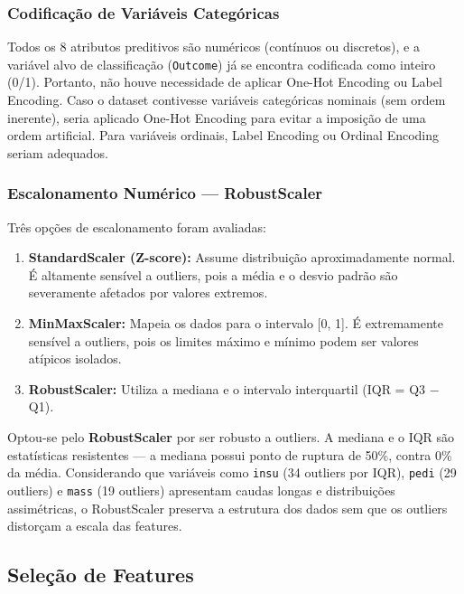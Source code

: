\documentclass[12pt]{article}
\begin{document}
\subsubsection{Codificação de Variáveis Categóricas}

Todos os 8 atributos preditivos são numéricos (contínuos ou discretos), e a variável alvo de classificação (\texttt{Outcome}) já se encontra codificada como inteiro (0/1). Portanto, não houve necessidade de aplicar One-Hot Encoding ou Label Encoding. Caso o dataset contivesse variáveis categóricas nominais (sem ordem inerente), seria aplicado One-Hot Encoding para evitar a imposição de uma ordem artificial. Para variáveis ordinais, Label Encoding ou Ordinal Encoding seriam adequados.

\subsubsection{Escalonamento Numérico --- RobustScaler}

Três opções de escalonamento foram avaliadas:

\begin{enumerate}
\item \textbf{StandardScaler (Z-score):} Assume distribuição aproximadamente normal. É altamente sensível a outliers, pois a média e o desvio padrão são severamente afetados por valores extremos.
\item \textbf{MinMaxScaler:} Mapeia os dados para o intervalo [0, 1]. É extremamente sensível a outliers, pois os limites máximo e mínimo podem ser valores atípicos isolados.
\item \textbf{RobustScaler:} Utiliza a mediana e o intervalo interquartil (IQR = Q3 $-$ Q1).

\end{enumerate}
Optou-se pelo \textbf{RobustScaler} por ser robusto a outliers. A mediana e o IQR são estatísticas resistentes --- a mediana possui ponto de ruptura de 50\%, contra 0\% da média. Considerando que variáveis como \texttt{insu} (34 outliers por IQR), \texttt{pedi} (29 outliers) e \texttt{mass} (19 outliers) apresentam caudas longas e distribuições assimétricas, o RobustScaler preserva a estrutura dos dados sem que os outliers distorçam a escala das features.

\subsection{Seleção de Features}
\end{document}

